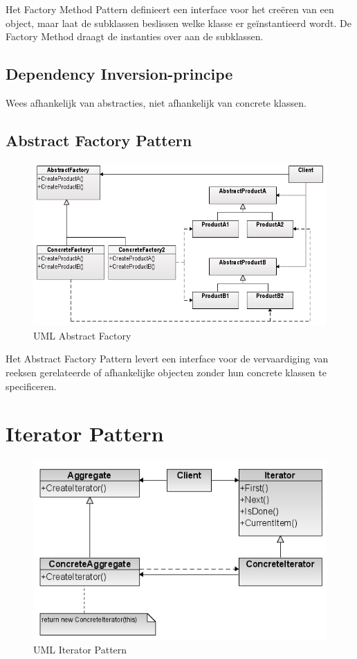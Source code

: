 \documentclass[a4paper,12pt]{article}
\begin{document}
Het Factory Method Pattern definieert een interface voor het creëren van een object, maar laat de subklassen beslissen welke klasse er geïnstantieerd wordt.
De Factory Method draagt de instanties over aan de subklassen.

\subsection{Dependency Inversion-principe}
Wees afhankelijk van abstracties, niet afhankelijk van concrete klassen.

\subsection{Abstract Factory Pattern}
\begin{figure}[H]
\centering
  	\includegraphics[width=.7\linewidth]{img/Factory/AbstractFactory.png}
  	\caption{UML Abstract Factory}
  	\label{fig:AbstractFactory}
\end{figure}

Het Abstract Factory Pattern levert een interface voor de vervaardiging van reeksen gerelateerde of afhankelijke objecten zonder hun concrete klassen te specificeren.

\section{Iterator Pattern}
\begin{figure}[H]
\centering
  	\includegraphics[width=.7\linewidth]{img/Iterator.png}
  	\caption{UML Iterator Pattern}
  	\label{fig:Iterator}
\end{figure}
\end{document}
